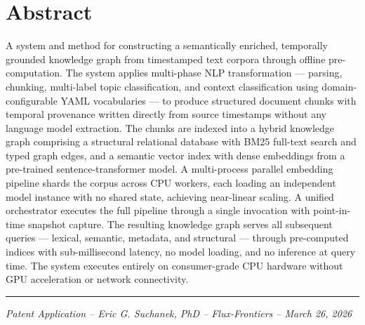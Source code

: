 \documentclass[12pt,letterpaper]{article}
\begin{document}
\section*{Abstract}

A system and method for constructing a semantically enriched, temporally grounded
knowledge graph from timestamped text corpora through offline pre-computation. The
system applies multi-phase NLP transformation --- parsing, chunking, multi-label topic
classification, and context classification using domain-configurable YAML vocabularies
--- to produce structured document chunks with temporal provenance written directly from
source timestamps without any language model extraction. The chunks are indexed into a
hybrid knowledge graph comprising a structural relational database with BM25 full-text
search and typed graph edges, and a semantic vector index with dense embeddings from a
pre-trained sentence-transformer model. A multi-process parallel embedding pipeline
shards the corpus across CPU workers, each loading an independent model instance with
no shared state, achieving near-linear scaling. A unified orchestrator executes the
full pipeline through a single invocation with point-in-time snapshot capture. The
resulting knowledge graph serves all subsequent queries --- lexical, semantic, metadata,
and structural --- through pre-computed indices with sub-millisecond latency, no model
loading, and no inference at query time. The system executes entirely on consumer-grade
CPU hardware without GPU acceleration or network connectivity.

\vspace{24pt}
\noindent\rule{\linewidth}{0.4pt}
\vspace{6pt}

\begin{center}
  \small
  \textit{Patent Application -- Eric G. Suchanek, PhD -- Flux-Frontiers -- March 26, 2026}
\end{center}
\end{document}
